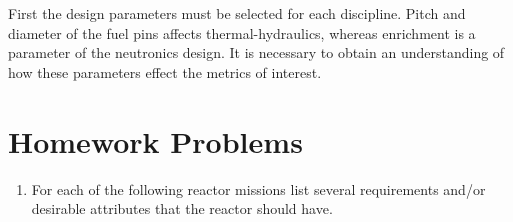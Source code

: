 \documentclass[]{article}
\begin{document}
First the design parameters must be selected for each discipline. Pitch and diameter of the fuel pins affects thermal-hydraulics, whereas enrichment is a parameter of the neutronics design. It is necessary to obtain an understanding of how these parameters effect the metrics of interest. 

\section{Homework Problems}
\begin{enumerate}
\item For each of the following reactor missions list several requirements and/or desirable attributes that the reactor should have. 
\end{enumerate}
\end{document}
